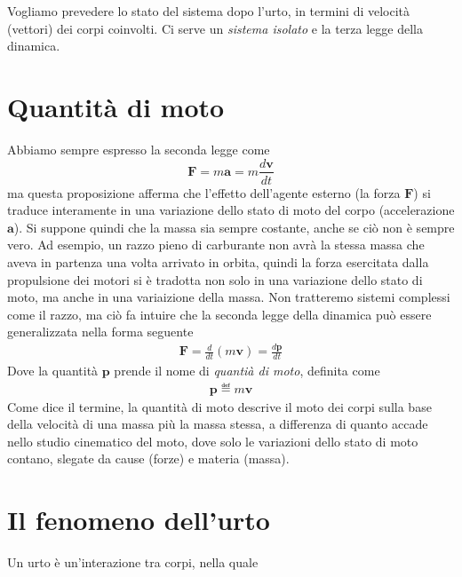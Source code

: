 \marginpar{\minitoc}

Vogliamo prevedere lo stato del sistema dopo l'urto, in termini di
velocità (vettori) dei corpi coinvolti. Ci serve un \textit{sistema
isolato} e la terza legge della dinamica.

\section{Quantità di moto}
Abbiamo sempre espresso la seconda legge come
\[ \mathbf{F} = m\mathbf{a} = m\frac{d\mathbf{v}}{dt} \]
ma questa proposizione afferma che l'effetto dell'agente esterno (la forza
$\mathbf{F}$) si traduce interamente in una variazione dello stato di
moto del corpo (accelerazione $\mathbf{a}$). Si suppone quindi che la
massa sia sempre costante, anche se ciò non è sempre vero. Ad esempio,
un razzo pieno di carburante non avrà la stessa massa che aveva in partenza
una volta arrivato in orbita, quindi la forza esercitata dalla propulsione
dei motori si è tradotta non solo in una variazione dello stato di moto,
ma anche in una variaizione della massa. Non tratteremo sistemi complessi
come il razzo, ma ciò fa intuire che la seconda legge della dinamica può
essere generalizzata nella forma seguente
\begin{align}
    \mathbf{F} = \frac{d}{dt}(m\mathbf{v}) = \frac{d\mathbf{p}}{dt}
\end{align}
Dove la quantità $\mathbf{p}$ prende il nome di \textit{quantià di moto},
definita come
\begin{align}
    \mathbf{p} \eqdef m\mathbf{v}
\end{align}
Come dice il termine, la quantità di moto descrive il moto dei corpi
sulla base della velocità di una massa più la massa stessa, a differenza
di quanto accade nello studio cinematico del moto, dove solo le variazioni
dello stato di moto contano, slegate da cause (forze) e materia (massa).

\section{Il fenomeno dell'urto}
\vspace{8pt}
\begin{tcolorbox}[colback = yellow!30, colframe = yellow!30!black, title = {Urto}]
    Un urto è un'interazione tra corpi, nella quale
\end{tcolorbox}
\vspace{5pt}


